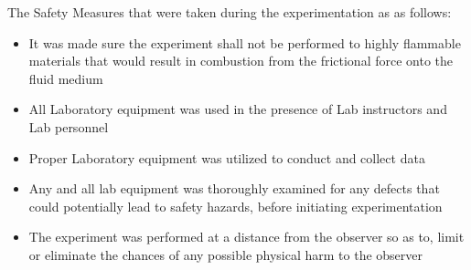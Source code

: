 

{The Safety Measures that were taken during the experimentation as as follows:}

	\begin{itemize}
		\item {It was made sure the experiment shall not be performed to highly flammable materials that would result in combustion from the frictional force onto the fluid medium}
		\item {All Laboratory equipment was used in the presence of Lab instructors and Lab personnel}
		\item {Proper Laboratory equipment was utilized to conduct and collect data}
		\item {Any and all lab equipment was thoroughly examined for any defects that could potentially lead to safety hazards, before initiating experimentation}
		\item {The experiment was performed at a distance from the observer so as to, limit or eliminate the chances of any possible physical harm to the observer}
	\end{itemize}

